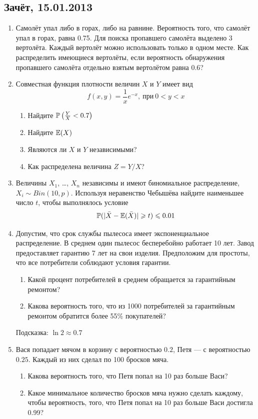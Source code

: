 \documentclass[12pt, a4paper]{article}\usepackage[]{graphicx}\usepackage[]{color}
\begin{document}
\subsection{Зачёт, 15.01.2013}


\begin{enumerate}
\item Самолёт упал либо в горах, либо на равнине. Вероятность того, что самолёт упал в горах, равна 0.75. Для поиска пропавшего самолёта выделено 3 вертолёта. Каждый вертолёт можно использовать только в одном месте. Как распределить имеющиеся вертолёты, если вероятность обнаружения пропавшего самолёта отдельно взятым вертолётом равна $0.6$?

\item Совместная функция плотности величин $X$ и $Y$ имеет вид
\[
f(x,y)=\frac{1}{x}e^{-x},\: \text{при}\: 0<y<x
\]

\begin{enumerate}
\item Найдите $\P\left( \frac{Y}{X}<0.7 \right)$
\item Найдите $\E(X)$
\item Являются ли $X$ и $Y$ независимыми?
\item Как распределена величина $Z=Y/X$?
\end{enumerate}

\item Величины $X_1$, \ldots, $X_n$ независимы и имеют биномиальное распределение, $X_i \sim Bin(10,p)$. Используя неравенство Чебышёва найдите наименьшее число $t$, чтобы выполнялось условие
\[
\P( | \bar{X}-\E(\bar{X}) | \geq t )\leq 0.01
\]



\item Допустим, что срок службы пылесоса имеет экспоненциальное распределение. В среднем один
пылесос бесперебойно работает 10 лет. Завод предоставляет гарантию 7 лет на свои изделия.
Предположим для простоты, что все потребители соблюдают условия гарантии.
\begin{enumerate}
\item Какой процент потребителей в среднем обращается за гарантийным ремонтом?
\item Какова вероятность того, что из 1000 потребителей за гарантийным ремонтом обратится
более 55\% покупателей?
\end{enumerate}
Подсказка: $\ln 2\approx 0.7$

\item Вася попадает мячом в корзину с вероятностью $0.2$, Петя — с вероятностью $0.25$. Каждый из них сделал по 100 бросков мяча.
\begin{enumerate}
\item Какова вероятность того, что Петя попал на 10 раз больше Васи?
\item Какое минимальное количество бросков мяча нужно сделать каждому, чтобы вероятность, того, что Петя попал на 10 раз больше Васи достигла 0.99?
\end{enumerate}
\end{enumerate}
\end{document}
